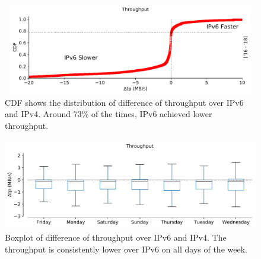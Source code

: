 \begin{figure}[!ht]
	\centering
	\includegraphics[keepaspectratio, height=4cm, width=15cm]{figures/throughput/netflix-throughput-difference.pdf}
	\caption[Throughput CDF]{CDF shows the distribution of difference of throughput over IPv6 and IPv4. Around 73\% of the times, IPv6 achieved lower throughput.}
	\label{fig:Throughput CDF}
\end{figure} 
\begin{figure}[!ht]
	\centering
	\includegraphics[keepaspectratio, height=4cm, width=15cm]{figures/throughput/netflix-throughput-boxplot-by-days.pdf}
	\caption[Throughput Boxplot by Days]{Boxplot of difference of throughput over IPv6 and IPv4. The throughput is consistently lower over IPv6 on all days of the week.}
	\label{fig:Throughput Boxplot by Days}
\end{figure}

\FloatBarrier
